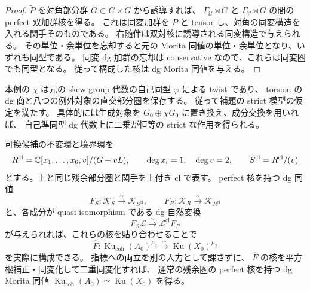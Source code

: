 \begin{proof}
$\widetilde P$ を対角部分群 $G\subset G\times G$ から誘導すれば、
$\Gamma_{\mathcal U}\rtimes G$ と $\Gamma_{\mathcal V}\rtimes G$ の間の
perfect 双加群核を得る。
これは同変加群を $P$ と tensor し、対角の同変構造を入れる関手そのものである。
右随伴は双対核に誘導される同変構造で与えられる。
その単位・余単位を忘却すると元の Morita 同値の単位・余単位となり、いずれも同型である。
同変 dg 加群の忘却は conservative なので、これらは同変圏でも同型となる。
従って構成した核は dg Morita 同値を与える。
\end{proof}

本例の $\chi$ は元の skew group 代数の自己同型 $\varphi$ による twist であり、
torsion の dg 商と八つの例外対象の直交部分圏を保存する。
従って補題の strict 模型の仮定を満たす。
具体的には生成対象を $G_0\oplus\chi G_0$ に置き換え、成分交換を用いれば、
自己準同型 dg 代数上に二乗が恒等の strict な作用を得られる。

\begin{proposition}[貼合せ核からの構成的比較]
\label{cmo:prop:root-order-comparison-criterion}
可換候補の不変環と境界環を
\[
 R^{\mathrm{cl}}=
  \mathbb C[x_1,\ldots,x_6,v]/(G-vL),\qquad
 \deg x_i=1,\quad\deg v=2,\qquad
 S^{\mathrm{cl}}=R^{\mathrm{cl}}/(v)
\]
とする。上と同じ残余部分圏と関手を上付き $\mathrm{cl}$ で表す。
perfect 核を持つ dg 同値
\[
 F_S:\mathcal K_S\xrightarrow{\sim}\mathcal K_{S^{\mathrm{cl}}},
 \qquad
 F_R:\mathcal K_R\xrightarrow{\sim}\mathcal K_{R^{\mathrm{cl}}}
\]
と、各成分が quasi-isomorphism である dg 自然変換
\begin{equation}
\label{cmo:eq:root-order-restriction-intertwiner}
 F_S\mathcal L\xrightarrow{\sim}\mathcal L^{\mathrm{cl}}F_R
\end{equation}
が与えられれば、これらの核を貼り合わせることで
\[
 \widehat F:\operatorname{Ku}_{\mathrm{coh}}(A_0)^{\mu_2}
       \xrightarrow{\sim}\operatorname{Ku}(X_0)^{\mu_2}
\]
を実際に構成できる。
指標への両立を別の入力として課さずに、
$\widehat F$ の核を平方根補正・同変化して二重同変化すれば、
通常の残余圏の perfect 核を持つ dg Morita 同値
$\operatorname{Ku}_{\mathrm{coh}}(A_0)\simeq\operatorname{Ku}(X_0)$ を得る。
\end{proposition}

